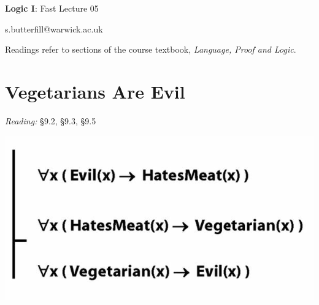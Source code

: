 \documentclass[12pt]{extarticle}
\date{}
\makeatletter
\def \ititle {Origins of Mind}
\def \isubtitle {Lecture 08}
\def \iemail{s.butterfill@warwick.ac.uk}
\makeatother
\begin{document}
\raggedcolumns

\begin{multicols*}{3}

\setlength\footnotesep{1em}









\def \ititle {Logic I}
 
\def \isubtitle {Fast Lecture 05}
 
\begin{center}
 
{\Large
 
\textbf{\ititle}: \isubtitle
 
}
 
 
 
\iemail %
 
\end{center}
 
Readings refer to sections of the course textbook, \emph{Language, Proof and Logic}.
 
 
 
\section{Vegetarians Are Evil}
 
\emph{Reading:} §9.2, §9.3, §9.5
 
\begin{center}
\includegraphics[scale=0.3]{img/vegetarians.png}
\end{center}
 

\end{multicols*}
\end{document}
